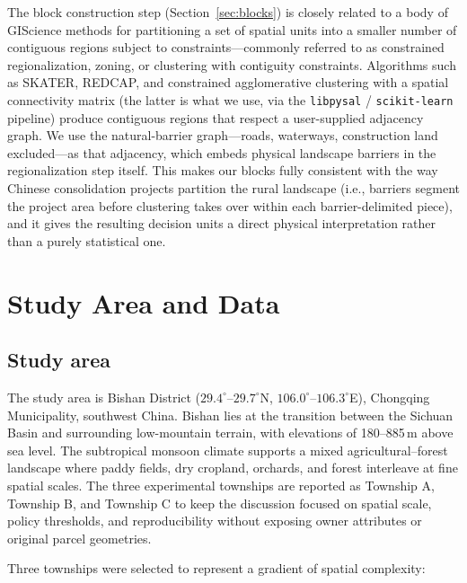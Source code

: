 \documentclass[preprint,12pt]{elsarticle}
\begin{document}
The block construction step (Section~\ref{sec:blocks}) is closely related to a body of GIScience methods for partitioning a set of spatial units into a smaller number of contiguous regions subject to constraints---commonly referred to as constrained regionalization, zoning, or clustering with contiguity constraints. Algorithms such as SKATER, REDCAP, and constrained agglomerative clustering with a spatial connectivity matrix (the latter is what we use, via the \texttt{libpysal} / \texttt{scikit-learn} pipeline) produce contiguous regions that respect a user-supplied adjacency graph. We use the natural-barrier graph---roads, waterways, construction land excluded---as that adjacency, which embeds physical landscape barriers in the regionalization step itself. This makes our blocks fully consistent with the way Chinese consolidation projects partition the rural landscape (i.e., barriers segment the project area before clustering takes over within each barrier-delimited piece), and it gives the resulting decision units a direct physical interpretation rather than a purely statistical one.


\section{Study Area and Data}
\label{sec:data}

\subsection{Study area}

The study area is Bishan District ($29.4^\circ$--$29.7^\circ$N, $106.0^\circ$--$106.3^\circ$E), Chongqing Municipality, southwest China. Bishan lies at the transition between the Sichuan Basin and surrounding low-mountain terrain, with elevations of 180--885\,m above sea level. The subtropical monsoon climate supports a mixed agricultural--forest landscape where paddy fields, dry cropland, orchards, and forest interleave at fine spatial scales. The three experimental townships are reported as Township A, Township B, and Township C to keep the discussion focused on spatial scale, policy thresholds, and reproducibility without exposing owner attributes or original parcel geometries.

Three townships were selected to represent a gradient of spatial complexity:
\end{document}
